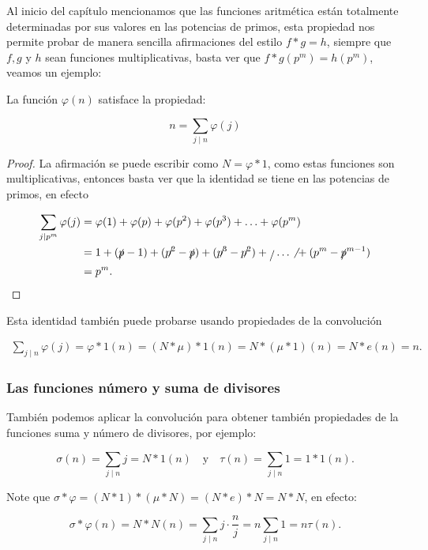 Al inicio del capítulo mencionamos que las funciones aritmética están totalmente determinadas por sus valores en las potencias de primos, esta propiedad nos permite probar de manera sencilla afirmaciones del estilo $f*g=h$, siempre que $f,g$ y $h$ sean funciones multiplicativas, basta ver que $f*g(p^m)=h(p^m)$, veamos un ejemplo:

\begin{theorem}
La función $\varphi(n)$ satisface la propiedad:

$$n=\sum_{j\mid n}\varphi(j)$$
\end{theorem}

\begin{proof}
La afirmación se puede  escribir como $N=\varphi*1$, como estas funciones son multiplicativas, entonces basta ver que la identidad se tiene en las potencias de primos, en efecto

\begin{align*}
    \sum_{j\mid p^m}\varphi(j)&=\varphi(1)+\varphi(p)+\varphi(p^2)+\varphi(p^3)+\ldots+\varphi(p^m)\\
    &=1+(\slashed{p}-1)+(\slashed{p^2}-\slashed{p})+(\slashed{p^3}-\slashed{p^2})+\slashed{ } \ldots\not{ } +(p^m-\slashed p^{m-1})\\
    &=p^m
.\end{align*}
\end{proof}

Esta identidad  también puede probarse usando propiedades  de la convolución

\begin{align*}
    \sum_{j\mid n}\varphi(j)=\varphi*1(n)=(N*\mu)*1(n)=N*(\mu*1)(n)=N*e(n)=n.
\end{align*}

\subsubsection{Las funciones número y suma de divisores}

También  podemos aplicar la convolución para obtener también propiedades de la funciones suma y número de divisores, por ejemplo:

\begin{equation}
\sigma(n)=\sum_{j\mid n}j=N*1(n) \quad \text{y} \quad \tau(n)=\sum_{j\mid n}1=1*1(n).
\end{equation}

Note que $\sigma*\varphi=(N*1)*(\mu*N)=(N*e)*N=N*N$, en efecto:

$$\sigma*\varphi(n)=N*N(n)=\sum_{j\mid n}j\cdot\frac{n}{j}=n\sum_{j\mid n}1=n\tau(n).$$

